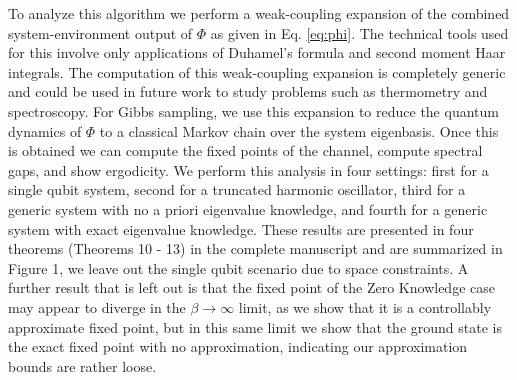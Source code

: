 \documentclass[11pt]{article}
\begin{document}
To analyze this algorithm we perform a weak-coupling expansion of the combined system-environment output of $\Phi$ as given in Eq. \eqref{eq:phi}. The technical tools used for this involve only applications of Duhamel's formula and second moment Haar integrals. The computation of this weak-coupling expansion is completely generic and could be used in future work to study problems such as thermometry and spectroscopy. For Gibbs sampling, we use this expansion to reduce the quantum dynamics of $\Phi$ to a classical Markov chain over the system eigenbasis. Once this is obtained we can compute the fixed points of the channel, compute spectral gaps, and show ergodicity. We perform this analysis in four settings: first for a single qubit system, second for a truncated harmonic oscillator, third for a generic system with no a priori eigenvalue knowledge, and fourth for a generic system with exact eigenvalue knowledge. These results are presented in four theorems (Theorems 10 - 13) in the complete manuscript and are summarized in Figure 1, we leave out the single qubit scenario due to space constraints. A further result that is left out is that the fixed point of the Zero Knowledge case may appear to diverge in the $\beta \to \infty$ limit, as we show that it is a controllably approximate fixed point, but in this same limit we show that the ground state is the exact fixed point with no approximation, indicating our approximation bounds are rather loose.
\end{document}
